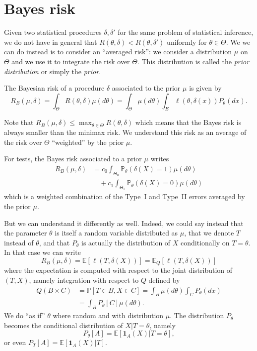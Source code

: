 \documentclass[
	fontsize=11pt, %
	twoside=false, %
	numbers=noenddot, %
]{kaobook}
\renewcommand{\P}{\mathbb P}
\newcommand{\E}{\mathbb E}
\newcommand{\ind}[1]{\mathbf 1_{#1}}
\begin{document}
\section{Bayes risk} %


Given two statistical procedures $\delta, \delta'$ for the same problem of statistical inference, we do not have in general that $R(\theta, \delta) < R(\theta, \delta')$ uniformly for $\theta \in \Theta$.
We we can do instead is to consider an ``averaged risk'': we consider a distribution $\mu$ on $\Theta$ and we use it to integrate the risk over $\Theta$.
This distribution is called the \emph{prior distribution} or simply the \emph{prior}.
\begin{definition}
	The Bayesian risk of a procedure $\delta$ associated to the prior $\mu$ is given by
	\begin{equation*}
		R_B(\mu, \delta) = \int_{\Theta} R(\theta, \delta) \mu(d \theta) = \int_{\Theta} \mu(d \theta) 
		\int_E \ell(\theta, \delta(x)) P_\theta(dx).
	\end{equation*}
\end{definition}
Note that $R_B(\mu, \delta) \leq \max_{\theta \in \Theta} R(\theta, \delta)$ which means that the Bayes risk is always smaller than the minimax risk.
We understand this risk as an average of the risk over $\Theta$ ``weighted'' by the prior $\mu$.
\begin{example}
	For tests, the Bayes risk associated to a prior $\mu$ writes
	\begin{align*}
		R_B(\mu, \delta) &= c_0 \int_{\Theta_0} \P_\theta(\delta(X) = 1) \mu(d \theta) \\
		& \quad + c_1 \int_{\Theta_1} \P_\theta(\delta(X) = 0) \mu(d \theta)
	\end{align*}
	which is a weighted combination of the Type~I and Type~II errors averaged by the prior $\mu$.
\end{example}

But we can understand it differently as well. 
Indeed, we could say instead that the parameter $\theta$ is itself a random variable distributed as $\mu$, that we denote $T$ instead of $\theta$, and that $P_\theta$ is actually the distribution of $X$ conditionally on $T = \theta$. 
In that case we can write
\begin{equation*}
	R_B(\mu, \delta) = \E[ \ell(T, \delta(X))] = \E_Q[ \ell(T, \delta(X))]
\end{equation*}
where the expectation is computed with respect to the joint distribution of $(T, X)$, namely integration with respect to $Q$ defined by
\begin{align*}
	Q(B \times C) &= \P[ T \in B, X \in C] = \int_B \mu(d \theta) \int_C P_\theta(dx) \\
	&= \int_B P_\theta[C] \mu(d \theta).
\end{align*}
We do ``as if'' $\theta$ where random and with distribution $\mu$.
The distribution $P_\theta$ becomes the conditional distribution of $X | T = \theta$, namely
\begin{equation*}
	P_\theta[A] = \E [\ind{A}(X) | T = \theta],
\end{equation*}
or even $P_T[A] = \E [\ind{A}(X) | T]$.
\end{document}
